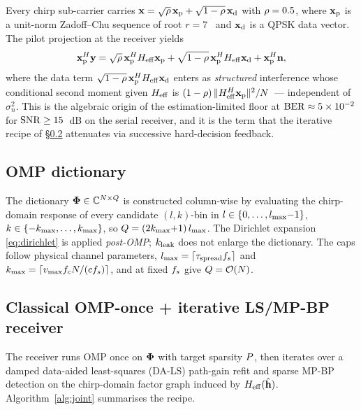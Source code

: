 Every chirp sub-carrier carries
$\mathbf{x}=\sqrt{\rho}\,\mathbf{x}_{\mathrm{p}}+\sqrt{1-\rho}\,\mathbf{x}_{\mathrm{d}}$ with $\rho=0.5$, where
$\mathbf{x}_{\mathrm{p}}$ is a unit-norm Zadoff--Chu sequence of root $r=7$~\cite{kaleh2005zadoffchu}
and $\mathbf{x}_{\mathrm{d}}$ is a QPSK data vector. The pilot projection at the receiver
yields
\begin{equation}
\mathbf{x}_{\mathrm{p}}^H\mathbf{y} = \sqrt{\rho}\,\mathbf{x}_{\mathrm{p}}^HH_{\mathrm{eff}}\mathbf{x}_{\mathrm{p}} + \sqrt{1-\rho}\,\mathbf{x}_{\mathrm{p}}^HH_{\mathrm{eff}}\mathbf{x}_{\mathrm{d}} + \mathbf{x}_{\mathrm{p}}^H\mathbf{n},
\label{eq:pilot_projection}
\end{equation}
where the data term $\sqrt{1-\rho}\,\mathbf{x}_{\mathrm{p}}^HH_{\mathrm{eff}}\mathbf{x}_{\mathrm{d}}$ enters as
\emph{structured} interference whose conditional second moment given
$H_{\mathrm{eff}}$ is $(1-\rho)\,\|H_{\mathrm{eff}}^H\mathbf{x}_{\mathrm{p}}\|^2/N$~--- independent of
$\sigma_n^2$. This is the algebraic origin of the estimation-limited
floor at $\mathrm{BER}\approx 5\times 10^{-2}$ for $\mathrm{SNR}\geq 15$~dB on the
serial receiver, and it is the term that the iterative recipe of
\S\ref{ssec:joint} attenuates via successive hard-decision feedback.

\subsection{OMP dictionary}
\label{ssec:dictionary}

The dictionary $\boldsymbol{\Phi}\in\mathbb{C}^{N\times Q}$ is constructed column-wise by
evaluating the chirp-domain response of every candidate $(l,k)$-bin in
$l\in\{0,\dots,l_{\max}{-}1\}$, $k\in\{-k_{\max},\dots,k_{\max}\}$, so
$Q=(2k_{\max}{+}1)\,l_{\max}$. The Dirichlet expansion \eqref{eq:dirichlet} is
applied \emph{post-OMP}; $k_{\mathrm{leak}}$ does not enlarge the dictionary. The
caps follow physical channel parameters,
$l_{\max}=\lceil\tau_{\text{spread}}f_s\rceil$ and
$k_{\max}=\lceil v_{\max}f_cN/(cf_s)\rceil$, and at fixed $f_s$ give
$Q=\mathcal{O}(N)$.

\subsection{Classical OMP-once + iterative LS/MP-BP receiver}
\label{ssec:joint}

The receiver runs OMP once on $\boldsymbol{\Phi}$ with target sparsity $P$,
then iterates over a damped data-aided least-squares (DA-LS) path-gain
refit and sparse MP-BP detection on the chirp-domain factor graph
induced by $H_{\mathrm{eff}}(\hat{\mathbf{h}})$. Algorithm~\ref{alg:joint} summarises the
recipe.

